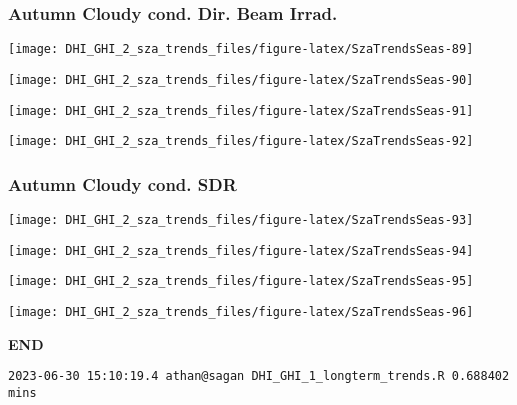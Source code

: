 \documentclass[
  10pt,
  a4paper,oneside]{article}
\begin{document}
\newpage

\hypertarget{autumn-cloudy-cond.-dir.-beam-irrad.}{%
\subsubsection{Autumn Cloudy cond. Dir. Beam Irrad.}\label{autumn-cloudy-cond.-dir.-beam-irrad.}}

\begin{center}\texttt{[image: DHI\_GHI\_2\_sza\_trends\_files/figure-latex/SzaTrendsSeas-89]} \end{center}

\begin{center}\texttt{[image: DHI\_GHI\_2\_sza\_trends\_files/figure-latex/SzaTrendsSeas-90]} \end{center}

\begin{center}\texttt{[image: DHI\_GHI\_2\_sza\_trends\_files/figure-latex/SzaTrendsSeas-91]} \end{center}

\begin{center}\texttt{[image: DHI\_GHI\_2\_sza\_trends\_files/figure-latex/SzaTrendsSeas-92]} \end{center}

\newpage

\hypertarget{autumn-cloudy-cond.-sdr}{%
\subsubsection{Autumn Cloudy cond. SDR}\label{autumn-cloudy-cond.-sdr}}

\begin{center}\texttt{[image: DHI\_GHI\_2\_sza\_trends\_files/figure-latex/SzaTrendsSeas-93]} \end{center}

\begin{center}\texttt{[image: DHI\_GHI\_2\_sza\_trends\_files/figure-latex/SzaTrendsSeas-94]} \end{center}

\begin{center}\texttt{[image: DHI\_GHI\_2\_sza\_trends\_files/figure-latex/SzaTrendsSeas-95]} \end{center}

\begin{center}\texttt{[image: DHI\_GHI\_2\_sza\_trends\_files/figure-latex/SzaTrendsSeas-96]} \end{center}

\textbf{END}

\begin{verbatim}
2023-06-30 15:10:19.4 athan@sagan DHI_GHI_1_longterm_trends.R 0.688402 mins
\end{verbatim}
\end{document}
